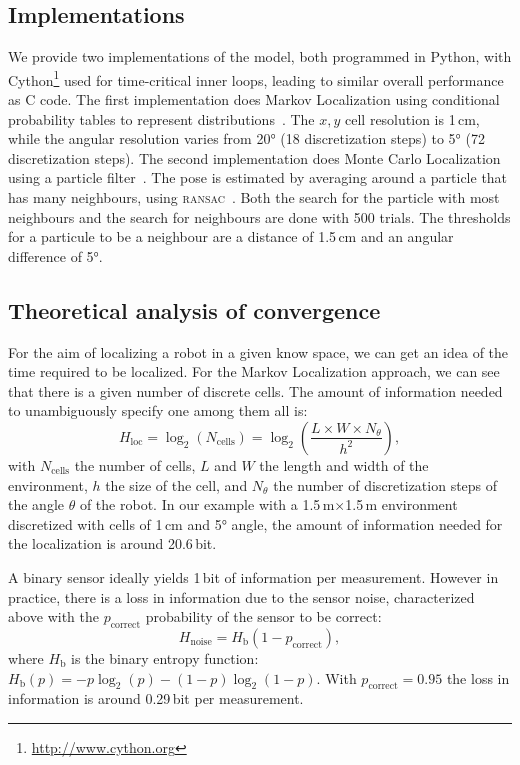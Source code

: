 \documentclass[letterpaper, 10pt, conference]{ieeeconf}
\begin{document}
\subsection{Implementations}

We provide two implementations of the model, both programmed in Python, with Cython\footnote{\url{http://www.cython.org}} used for time-critical inner loops, leading to similar overall performance as C code.
The first implementation does Markov Localization using conditional probability tables to represent distributions~\cite{fox1999markov}.
The $x,y$ cell resolution is 1\,cm, while the angular resolution varies from 20° (18 discretization steps) to 5° (72 discretization steps).
The second implementation does Monte Carlo Localization using a particle filter~\cite{dellaert1999monte}.
The pose is estimated by averaging around a particle that has many neighbours, using \textsc{ransac}~\cite{Fischler1981ransac}.
Both the search for the particle with most neighbours and the search for neighbours are done with 500 trials.
The thresholds for a particule to be a neighbour are a distance of 1.5\,cm and an angular difference of 5°.

\subsection{Theoretical analysis of convergence}
\label{sec:theoreticalconv}

For the aim of localizing a robot in a given know space, we can get an idea of the time required to be localized.
For the Markov Localization approach, we can see that there is a given number of discrete cells.
The amount of information needed to unambiguously specify one among them all is:
\begin{displaymath}
	H_\mathrm{loc} = \log_2(N_\mathrm{cells}) = \log_2\left(\frac{L\times W\times N_{\theta}}{h^2}\right),
\end{displaymath}
with $N_\mathrm{cells}$ the number of cells, $L$ and $W$ the length and width of the environment, $h$ the size of the cell, and $N_{\theta}$ the number of discretization steps of the angle $\theta$ of the robot.
In our example with a 1.5\,m$\times$1.5\,m environment discretized with cells of 1\,cm and 5° angle, the amount of information needed for the localization is around 20.6\,bit.

A binary sensor ideally yields 1\,bit of information per measurement.
However in practice, there is a loss in information due to the sensor noise, characterized above with the $p_\mathrm{correct}$ probability of the sensor to be correct:
\begin{displaymath}
	H_\mathrm{noise} = H_{\text{b}}(1 - p_\mathrm{correct}),
\end{displaymath}
where $H_{\text{b}}$ is the binary entropy function: $H_{\text{b}}(p) = -p\log_2(p) - (1-p)\log_2(1-p)$.
With $p_\mathrm{correct}=0.95$ the loss in information is around 0.29\,bit per measurement.
\end{document}
